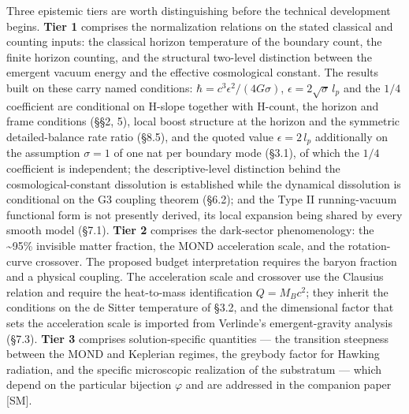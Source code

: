 \documentclass[
]{article}
\begin{document}
Three epistemic tiers are worth distinguishing before the technical
development begins. \textbf{Tier 1} comprises the normalization
relations on the stated classical and counting inputs: the classical
horizon temperature of the boundary count, the finite horizon counting,
and the structural two-level distinction between the emergent vacuum
energy and the effective cosmological constant. The results built on
these carry named conditions: \(\hbar = c^3\epsilon^2/(4G\sigma)\),
\(\epsilon = 2\sqrt{\sigma}\,l_p\) and the \(1/4\) coefficient are
conditional on H-slope together with H-count, the horizon and frame
conditions (§§2, 5), local boost structure at the horizon and the
symmetric detailed-balance rate ratio (§8.5), and the quoted value
\(\epsilon = 2\,l_p\) additionally on the assumption \(\sigma = 1\) of
one nat per boundary mode (§3.1), of which the \(1/4\) coefficient is
independent; the descriptive-level distinction behind the
cosmological-constant dissolution is established while the dynamical
dissolution is conditional on the G3 coupling theorem (§6.2); and the
Type II running-vacuum functional form is not presently derived, its
local expansion being shared by every smooth model (§7.1). \textbf{Tier
2} comprises the dark-sector phenomenology: the \textasciitilde95\%
invisible matter fraction, the MOND acceleration scale, and the
rotation-curve crossover. The proposed budget interpretation requires
the baryon fraction and a physical coupling. The acceleration scale and
crossover use the Clausius relation and require the heat-to-mass
identification \(Q=M_Bc^2\); they inherit the conditions on the de
Sitter temperature of §3.2, and the dimensional factor that sets the
acceleration scale is imported from Verlinde's emergent-gravity analysis
(§7.3). \textbf{Tier 3} comprises solution-specific quantities --- the
transition steepness between the MOND and Keplerian regimes, the
greybody factor for Hawking radiation, and the specific microscopic
realization of the substratum --- which depend on the particular
bijection \(\varphi\) and are addressed in the companion paper {[}SM{]}.
\end{document}
